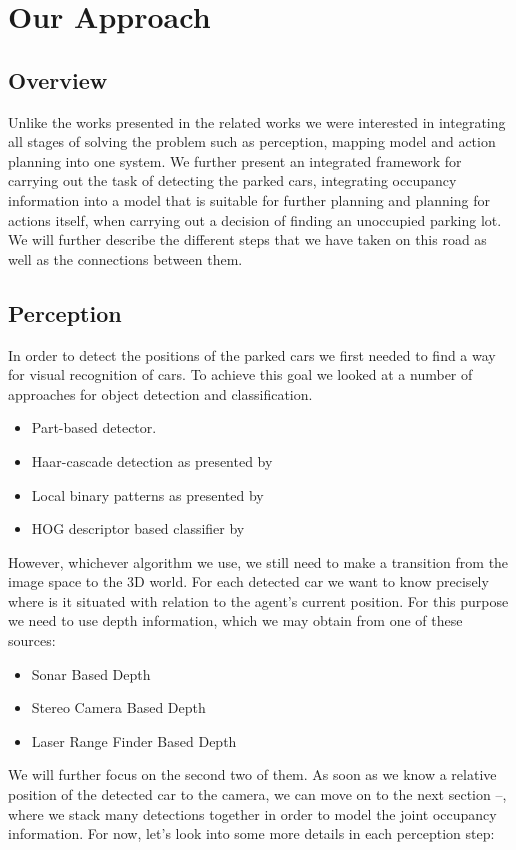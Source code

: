
\newcommand\Bx{x}
\newcommand\Bm{m}
\def\v{\vm{v}}
\newcommand\vm[1]{\bm{\mathrm{#1}}}
\renewcommand{\v}{{\mbox{a}^i}}
\newcommand{\z}{z_{t}}
\newcommand{\y}{z_{1:t-1}}

\chapter{Our Approach}
\label{cha:our_approach}

\section{Overview} %
\label{sec:overview}
Unlike the works presented in the related works we were interested in integrating all stages of solving the problem such as perception, mapping model and action planning into one system. We further present an integrated framework for carrying out the task of detecting the parked cars, integrating occupancy information into a model that is suitable for further planning and planning for actions itself, when carrying out a decision of finding an unoccupied parking lot.
We will further describe the different steps that we have taken on this road as well as the connections between them.

\section{Perception} %
\label{sec:perception}
    In order to detect the positions of the parked cars we first needed to find a way for visual recognition of cars. To achieve this goal we looked at a number of approaches for object detection and classification.
    \begin{itemize}
        \item Part-based detector.
        \item Haar-cascade detection as presented by~\cite{violajones2001}
        \item Local binary patterns as presented by~\cite{lbp2010}
        \item HOG descriptor based classifier by~\cite{dalal2005}
    \end{itemize}
    However, whichever algorithm we use, we still need to make a transition from the image space to the 3D world. For each detected car we want to know precisely where is it situated with relation to the agent's current position.
    For this purpose we need to use depth information, which we may obtain from one of these sources:
    \begin{itemize}
        \item Sonar Based Depth
        \item Stereo Camera Based Depth
        \item Laser Range Finder Based Depth
    \end{itemize}
    We will further focus on the second two of them.
    As soon as we know a relative position of the detected car to the camera, we can move on to the next section --, where we stack many detections together in order to model the joint occupancy information.
    For now, let's look into some more details in each perception step:
